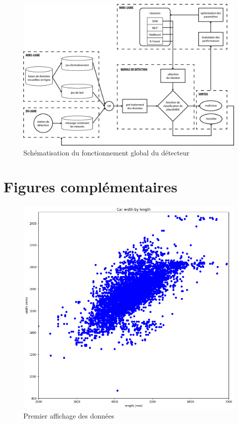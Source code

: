 \documentclass[a4paper]{report}
\begin{document}
\begin{figure}
\centering
\includegraphics[width=\textwidth]{img/structure.png}
\caption{Schématisation du fonctionnement global du détecteur}
\end{figure}





\listoffigures
\begingroup
\let\clearpage\relax
\listoftables
\endgroup

\appendix

\chapter{Figures complémentaires}

\begin{figure}
\centering
\includegraphics[width=\textwidth]{img/first_plot.png}
\caption{Premier affichage des données\label{first_plot}}
\end{figure}
\end{document}

